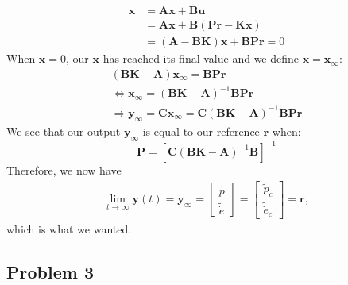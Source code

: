 \begin{align*}
  \dot{\boldsymbol{x}} &= \boldsymbol{Ax} + \boldsymbol{Bu} \\
                       &= \boldsymbol{Ax} +
                         \boldsymbol{B}(\boldsymbol{Pr} -
                         \boldsymbol{Kx}) \\
											 &= (\boldsymbol{A}-\boldsymbol{BK})\boldsymbol{x}
												+ \boldsymbol{BPr} = 0
\end{align*}
When $\boldsymbol{\dot{x}} = 0$, our $\boldsymbol{x}$ has reached its final value and we define $\boldsymbol{x} = \boldsymbol{x_\infty}$:
\begin{align*}
(\boldsymbol{BK} - \boldsymbol{A})\boldsymbol{x_\infty} = \boldsymbol{BPr} \\
\Leftrightarrow \boldsymbol{x_\infty} = (\boldsymbol{BK} - \boldsymbol{A})^{-1}\boldsymbol{BPr} \\
\Rightarrow \boldsymbol{y_\infty} = \boldsymbol{Cx_\infty} = \boldsymbol{C}(\boldsymbol{BK} - \boldsymbol{A})^{-1}\boldsymbol{BPr}
\end{align*}
We see that our output $\boldsymbol{y_\infty}$ is equal to our reference $\boldsymbol{r}$ when:
\begin{equation}
\boldsymbol{P} = [\boldsymbol{C}(\boldsymbol{BK} - \boldsymbol{A})^{-1}\boldsymbol{B}]^{-1}
\end{equation}
Therefore, we now have
\begin{align*}
\lim_{t\to\infty}\boldsymbol{y}(t) = \boldsymbol{y_\infty} =
\begin{bmatrix}
\tilde{p} \\
\tilde{\dot{e}}
\end{bmatrix}
= 
\begin{bmatrix}
\tilde{p}_c \\
\tilde{\dot{e}}_c
\end{bmatrix}
= \boldsymbol{r},
\end{align*}
which is what we wanted.
\subsection{Problem 3}
